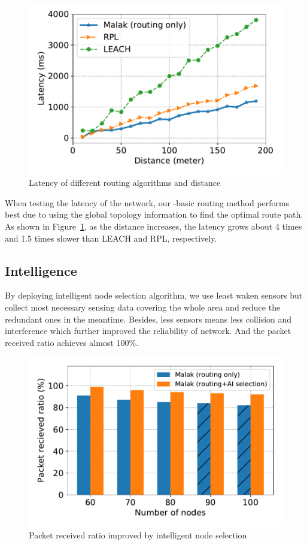 \begin{figure}[htbp]
	\centering
	\includegraphics[width=.95\columnwidth]{Figure/latency}
	\vspace{-0.1in}
	\caption{Latency of different routing algorithms and distance
		\textnormal{
		}}
	\label{fig:latency}
\end{figure}

When testing the latency of the network, our {\sdn}-basic routing method
performs best due to using the global topology information to find the optimal
route path. As shown in Figure~\ref{fig:latency}, as the distance increases, the
latency grows about 4 times and 1.5 times slower than LEACH and RPL,
respectively.

\subsection{Intelligence}

By deploying intelligent node selection algorithm, we use least waken sensors
but collect most necessary sensing data covering the whole area and reduce the
redundant ones in the meantime. Besides, less sensors means less collision and
interference which further improved the reliability of network. And the packet
received ratio achieves almost 100\%.

\begin{figure}[htbp]
	\centering
	\includegraphics[width=.95\columnwidth]{Figure/ai_selection}
	\vspace{-0.1in}
	\caption{Packet received ratio improved by intelligent node selection
		\textnormal{
		}}
	\label{fig:ai_selection}
\end{figure}

